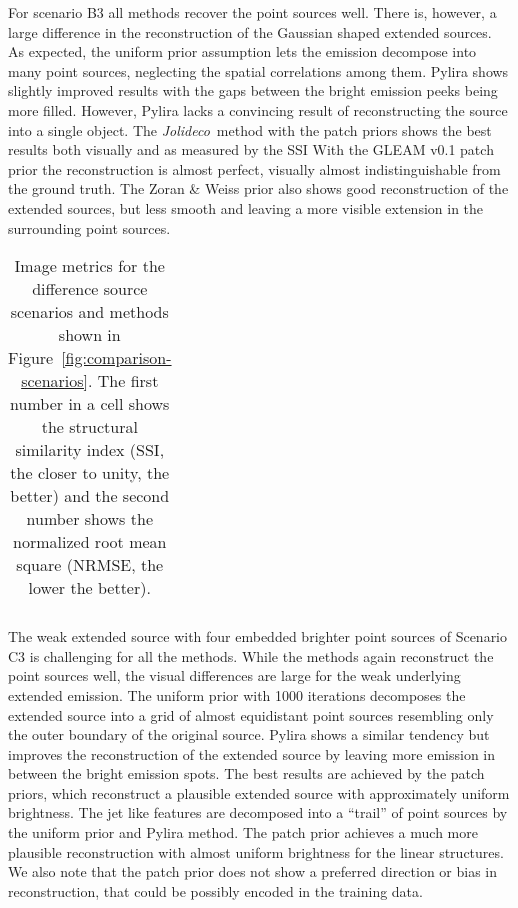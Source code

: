 \documentclass[twocolumn]{aastex631}
\newcommand{\jolideco}{\textit{Jolideco}~}
\begin{document}
    For scenario B3 all methods recover the point sources well.  There is, however, a large difference  in the reconstruction of the Gaussian shaped extended sources. As expected, the uniform prior assumption lets the emission decompose into many point sources, neglecting the spatial correlations among them. Pylira shows slightly improved results with the gaps between the bright emission peeks being more filled. However, Pylira lacks a convincing result of reconstructing the source into a single object. The \jolideco method with the patch priors shows the best results both visually and as measured by the SSI With the GLEAM v0.1 patch prior the reconstruction is almost perfect, visually almost indistinguishable from the ground truth. The Zoran \& Weiss prior also shows good reconstruction of the extended sources, but less smooth and leaving a more visible extension in the surrounding point sources.
    \begin{table*}
    \centering
        \begin{tabular}{ c|c|c|c|c|c } 
            
        \end{tabular}
        \label{tab:metrics}
        \caption{Image metrics for the difference source scenarios and methods shown in Figure~\ref{fig:comparison-scenarios}. The first number in a cell shows the structural similarity index (SSI, the closer to unity, the better) and the second number shows the normalized root mean square (NRMSE, the lower the better).}
    \end{table*}
    The weak extended source with four embedded brighter point sources of Scenario C3 is challenging for all the methods. While the methods again reconstruct the point sources well, the visual differences are large for the weak underlying extended emission. The uniform prior with 1000 iterations decomposes the extended source into a grid of almost equidistant point sources resembling only the outer boundary of the original source. Pylira shows a similar tendency but improves the reconstruction of the extended source by leaving more emission in between the bright emission spots. The best results are achieved by the patch priors, which reconstruct a plausible extended source with approximately uniform brightness. The jet like features are decomposed into a \enquote{trail} of point sources by the uniform prior and Pylira method. The patch prior achieves a much more plausible reconstruction with almost uniform brightness for the linear structures. We also note that the patch prior does not show a preferred direction or bias in reconstruction, that could be possibly encoded in the training data.
    
\end{document}
